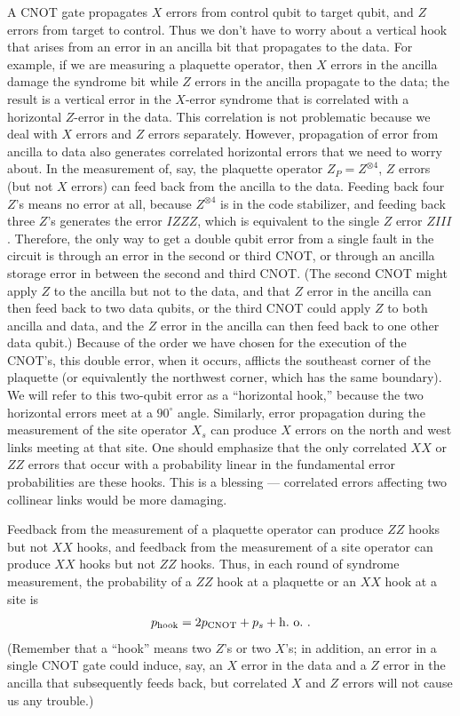 A CNOT gate propagates $X$ errors from control qubit to target qubit, and $Z$ errors from target to control. Thus we don't have to worry about a vertical hook that arises from an error in an ancilla bit that propagates to the data. For example, if we are measuring a plaquette operator, then $X$ errors in the ancilla damage the syndrome bit while $Z$ errors in the ancilla propagate to the data; the result is a vertical error in the $X$-error syndrome that is correlated with a horizontal $Z$-error in the data. This correlation is not problematic because we deal with $X$ errors and $Z$ errors separately. However, propagation of error from ancilla to data also generates correlated horizontal errors that we need to worry about. In the measurement of, say, the plaquette operator $Z_P=Z^{\otimes 4}$, $Z$ errors (but not $X$ errors) can feed back from the ancilla to the data.  Feeding back four $Z$'s
means no error at all, because $Z^{\otimes 4}$ is in the code stabilizer, and feeding back three $Z$'s generates the error $IZZZ$, which is equivalent to the single $Z$ error $ZIII$. Therefore, the only way to get a double qubit error from a single fault in the circuit is through an error in the second or third CNOT, or through an ancilla storage error in between the second and third CNOT. (The second CNOT might apply $Z$ to the ancilla but not to the data, and that $Z$ error in the ancilla can then feed back to two data qubits, or the third CNOT could apply $Z$ to both ancilla and data, and the $Z$ error in the ancilla can then feed back to one other data qubit.) Because of the order we have chosen for the execution of the CNOT's, this double error, when it occurs, afflicts the southeast corner of the plaquette (or equivalently the northwest corner, which has the same boundary). We will refer to this two-qubit error as a ``horizontal hook,'' because the two horizontal errors meet at a $90^\circ$ angle. Similarly, error propagation during the measurement of the site operator $X_s$ can produce $X$ errors on the north and west links meeting at that site. One should emphasize that the only correlated $XX$ or $ZZ$ errors that occur with a probability linear in the fundamental error probabilities are these hooks. This is a blessing --- correlated errors affecting two collinear links would be more damaging.

Feedback from the measurement of a plaquette operator can produce $ZZ$ hooks but not $XX$ hooks, and feedback from the measurement of a site operator can produce $XX$ hooks but not $ZZ$ hooks. Thus, in each round of syndrome measurement, the probability of a $ZZ$ hook at a plaquette or an $XX$ hook at a site is
\begin{equation}
p_{\rm hook} = 2 p_{\rm CNOT} + p_s +{\rm h.~o.}~.
\end{equation}
(Remember that a ``hook'' means two $Z$'s or two $X$'s; in addition, an error in a single CNOT gate could induce, say, an $X$ error in the data and a $Z$
error in the ancilla that subsequently feeds back, but correlated $X$ and $Z$
errors will not cause us any trouble.) 

